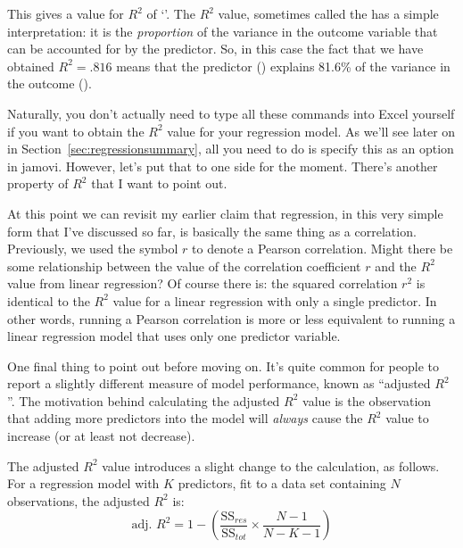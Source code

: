 This gives a value for $R^2$ of `'. The $R^2$ value, sometimes called the  has a simple interpretation: it is the {\it proportion} of the variance in the outcome variable that can be accounted for by the predictor. So, in this case the fact that we have obtained $R^2 = .816$ means that the predictor () explains 81.6\% of the variance in the outcome (). 

Naturally, you don't actually need to type all these commands into Excel yourself if you want to obtain the $R^2$ value for your regression model. As we'll see later on in Section~\ref{sec:regressionsummary}, all you need to do is specify this as an option in jamovi. However, let's put that to one side for the moment. There's another property of $R^2$ that I want to point out. 


At this point we can revisit my earlier claim that regression, in this very simple form that I've discussed so far, is basically the same thing as a correlation. Previously, we used the symbol $r$ to denote a Pearson correlation. Might there be some relationship between the value of the correlation coefficient $r$ and the $R^2$ value from linear regression? Of course there is: the squared correlation $r^2$ is identical to the $R^2$ value for a linear regression with only a single predictor. In other words, running a Pearson correlation is more or less equivalent to running a linear regression model that uses only one predictor variable.


One final thing to point out before moving on. It's quite common for people to report a slightly different measure of model performance, known as ``adjusted $R^2$''. The motivation behind calculating the adjusted $R^2$ value is the observation that adding more predictors into the model will {\it always} cause the $R^2$ value to increase (or at least not decrease). 

\vspace{0.5cm}
\begin{mdframed}[style=MyFrame,nobreak=false]
The adjusted $R^2$ value introduces a slight change to the calculation, as follows. For a regression model with $K$ predictors, fit to a data set containing $N$ observations, the adjusted $R^2$ is:
$$
\mbox{adj. } R^2 = 1 - \left(\frac{\mbox{SS}_{res}}{\mbox{SS}_{tot}} \times \frac{N-1}{N-K-1} \right)
$$
\end{mdframed}

